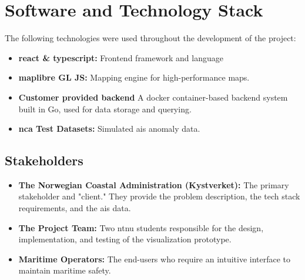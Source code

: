 \section{Software and Technology Stack}
The following technologies were used throughout the development of the project:
\begin{itemize}
\item \textbf{\gls{react} \& \gls{typescript}:} Frontend framework and language
\item \textbf{\gls{maplibre} GL JS:} Mapping engine for high-performance maps.
\item \textbf{Customer provided backend} A \gls{docker} container-based backend system built in Go, used for data storage and querying.
\item \textbf{\acrshort{nca} Test Datasets:} Simulated \acrshort{ais} anomaly data.
\end{itemize}

\subsection{Stakeholders}

\begin{itemize}
\item \textbf{The Norwegian Coastal Administration (Kystverket):} The primary stakeholder and "client." They provide the problem description, the tech stack requirements, and the \acrshort{ais} data.
\item \textbf{The Project Team:} Two \acrshort{ntnu} students responsible for the design, implementation, and testing of the visualization prototype.
\item \textbf{Maritime Operators:} The end-users who require an intuitive interface to maintain maritime safety.
\end{itemize}



